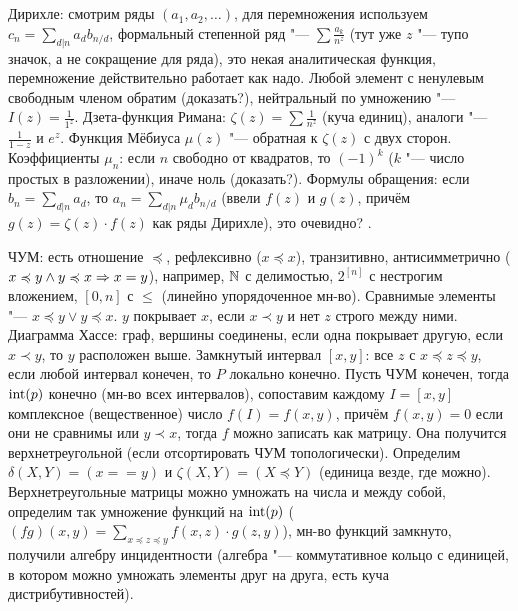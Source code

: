 \section{} %
Дирихле: смотрим ряды $(a_1, a_2, \dots)$, для перемножения используем $c_n=\sum_{d|n} a_db_{n/d}$,
формальный степенной ряд "--- $\sum \frac{a_k}{n^z}$ (тут уже $z$ "--- тупо значок, а не сокращение для ряда),
это некая аналитическая функция, перемножение действительно работает как надо.
Любой элемент с ненулевым свободным членом обратим (\TODO доказать?), нейтральный по умножению "--- $I(z)=\frac{1}{1^z}$.
Дзета-функция Римана: $\zeta(z) = \sum \frac{1}{n^z}$ (куча единиц), аналоги "--- $\frac{1}{1-z}$ и $e^z$.
Функция Мёбиуса $\mu(z)$ "--- обратная к $\zeta(z)$ с двух сторон.
Коэффициенты $\mu_n$: если $n$ свободно от квадратов, то $(-1)^k$ ($k$ "--- число простых в разложении), иначе ноль (\TODO доказать?).
Формулы обращения: если $b_n=\sum_{d|n} a_d$, то $a_n=\sum_{d|n} \mu_d b_{n/d}$ (ввели $f(z)$ и $g(z)$, причём
$g(z)=\zeta(z) \cdot f(z)$ как ряды Дирихле), это очевидно? \TODO.

ЧУМ: есть отношение $\preccurlyeq$, рефлексивно ($x \preccurlyeq x$), транзитивно, антисимметрично ($x\preccurlyeq y \land y \preccurlyeq x \Rightarrow x=y$),
например, $\mathbb{N}$ с делимостью, $2^{[n]}$ с нестрогим вложением, $[0, n]$ с $\le$ (линейно упорядоченное мн-во).
Сравнимые элементы "--- $x \preccurlyeq y \lor y \preccurlyeq x$.
$y$ покрывает $x$, если $x \prec y$ и нет $z$ строго между ними.
Диаграмма Хассе: граф, вершины соединены, если одна покрывает другую, если $x \prec y$, то $y$ расположен выше.
Замкнутый интервал $[x, y]$: все $z$ с $x \preccurlyeq z \preccurlyeq y$, если любой интервал конечен, то $P$ локально конечно.
Пусть ЧУМ конечен, тогда $\operatorname{int}(p)$ конечно (мн-во всех интервалов), сопоставим каждому $I=[x,y]$ комплексное (вещественное) число
$f(I)=f(x,y)$, причём $f(x,y)=0$ если они не сравнимы или $y \prec x$, тогда $f$ можно записать как матрицу.
Она получится верхнетреугольной (если отсортировать ЧУМ топологически).
Определим $\delta(X, Y)=(x==y)$ и $\zeta(X, Y)=(X \preccurlyeq Y)$ (единица везде, где можно).
Верхнетреугольные матрицы можно умножать на числа и между собой, определим так умножение функций на $\operatorname{int}(p)$
($(fg)(x, y) = \sum_{x \preccurlyeq z \preccurlyeq y} f(x, z) \cdot g(z, y)$), мн-во функций замкнуто,
получили алгебру инцидентности (алгебра "--- коммутативное кольцо с единицей, в котором можно умножать элементы друг на друга, есть куча дистрибутивностей).

